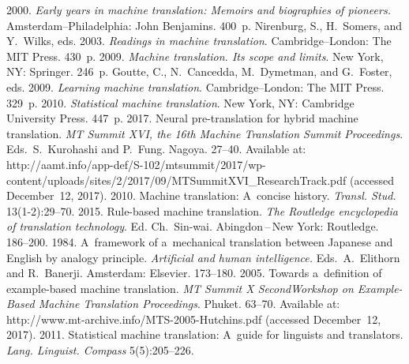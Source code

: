 \begin{multicols}{2}
{{\begin{thebibliography}{99}
 2000. \textit{Early years in machine translation: 
Memoirs and biographies of pioneers.} Amsterdam--Philadelphia: John 
Benjamins. 400~p.
Nirenburg, S., H.~Somers, and Y.~Wilks, eds. 2003. \textit{Readings in 
machine translation}. Cambridge--London: The MIT Press. 430~p.
 2009. \textit{Machine translation. Its scope and limits}. New 
York, NY: Springer. 246~p.
Goutte, C., N.~Cancedda, M.~Dymetman, and G.~Foster, eds. 2009. 
\textit{Learning machine translation}. Cambridge--London: The MIT 
Press. 329~p.
 2010. \textit{Statistical machine translation}. New York, 
NY: Cambridge University Press. 447~p.
 2017. Neural pre-translation for hybrid machine 
translation. \textit{MT Summit XVI, the 16th Machine 
Translation Summit Proceedings}. Eds.\ S.~Kurohashi  and P.~Fung. Nagoya. 27--40. 
Available at: {\sf  
http://aamt.info/app-def/S-102/mtsummit/2017/wp-content/uploads/sites/2/2017/09/MTSummitXVI\_\linebreak ResearchTrack.pdf} (accessed 
December~12, 2017).
 2010. Machine translation: A~concise history. 
\textit{Transl. Stud.} 13(1-2):29--70.
 2015. Rule-based machine translation.
\textit{The Routledge encyclopedia of translation technology}.
Ed. Ch.~Sin-wai.  Abingdon\,--\,New York: Routledge. 186--200.
 1984. A~framework of a~mechanical translation between 
Japanese and English by analogy principle. \textit{Artificial and human 
intelligence.} Eds.\ A.~Elithorn and R.~Banerji. Amsterdam: Elsevier.  
173--180.
 2005. Towards a~definition of example-based machine 
translation. \textit{MT Summit X Second\linebreak Workshop on Example-Based Machine 
Translation Proceedings}. Phuket. 63--70. Available at: {\sf  
http://www.\linebreak mt-archive.info/MTS-2005-Hutchins.pdf} (accessed December~12, 
2017).
 2011. Statistical machine translation: A~guide 
for linguists and translators. \textit{Lang. Linguist. Compass}  
5(5):205--226.


\end{thebibliography}}}
\end{multicols}
